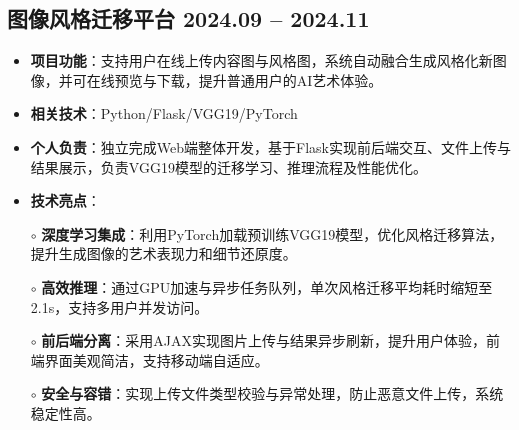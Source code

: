 \subsection{\textbf{图像风格迁移平台} \hspace{2cm} {2024.09 -- 2024.11}}
\begin{normalsize}
  \begin{itemize}
    \item \textbf{项目功能}：支持用户在线上传内容图与风格图，系统自动融合生成风格化新图像，并可在线预览与下载，提升普通用户的AI艺术体验。
    \item \textbf{相关技术}：Python/Flask/VGG19/PyTorch
    \item \textbf{个人负责}：独立完成Web端整体开发，基于Flask实现前后端交互、文件上传与结果展示，负责VGG19模型的迁移学习、推理流程及性能优化。
    \item \textbf{技术亮点}：
      \setlength{\itemindent}{1em}
      \item[$\circ$] \textbf{深度学习集成}：利用PyTorch加载预训练VGG19模型，优化风格迁移算法，提升生成图像的艺术表现力和细节还原度。
      \item[$\circ$] \textbf{高效推理}：通过GPU加速与异步任务队列，单次风格迁移平均耗时缩短至2.1s，支持多用户并发访问。
      \item[$\circ$] \textbf{前后端分离}：采用AJAX实现图片上传与结果异步刷新，提升用户体验，前端界面美观简洁，支持移动端自适应。
      \item[$\circ$] \textbf{安全与容错}：实现上传文件类型校验与异常处理，防止恶意文件上传，系统稳定性高。
  \end{itemize}
\end{normalsize}